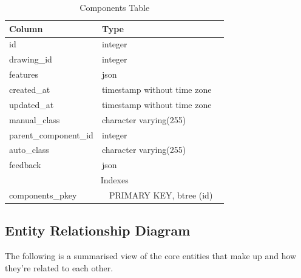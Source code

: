\begin{table}[H]

    \begin{tabularx}{\textwidth}{ l l X }
      \toprule
      Column                 & Type                       \\
      \midrule
      id                    & integer                     \\
      drawing\_id           & integer                     \\
      features              & json                        \\
      created\_at           & timestamp without time zone \\
      updated\_at           & timestamp without time zone \\
      manual\_class         & character varying(255)      \\
      parent\_component\_id & integer                     \\
      auto\_class           & character varying(255)      \\
      feedback              & json                        \\
      \midrule
      \multicolumn{3}{c}{Indexes} \\
      \midrule
      components\_pkey & \multicolumn{2}{c}{PRIMARY KEY, btree (id)} \\
      \bottomrule
    \end{tabularx}

    \caption{Components Table}
    \label{table:db-components}
\end{table}

\subsection{Entity Relationship Diagram}

The following is a summarised view of the core entities that make up \noteED and how they're related to each other.

